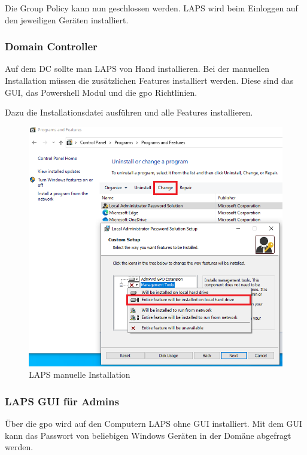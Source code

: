 Die Group Policy kann nun geschlossen werden.
LAPS wird beim Einloggen auf den jeweiligen Geräten installiert.

\subsubsection{Domain Controller}
Auf dem DC sollte man LAPS von Hand installieren.
Bei der manuellen Installation müssen die zusätzlichen Features installiert werden.
Diese sind das GUI, das Powershell Modul und die \acrshort{gpo} Richtlinien.

Dazu die Installationsdatei ausführen und alle Features installieren.
\begin{figure}[H]
    \centering
    \includegraphics[width=0.7\linewidth]{../img/LAPS/laps-ui-install-2.png}
    \caption{LAPS manuelle Installation}
\end{figure}


\subsubsection{LAPS GUI für Admins}\label{subsubsec:Laps-Gui}
Über die \acrshort{gpo} wird auf den Computern LAPS ohne GUI installiert.
Mit dem GUI kann das Passwort von beliebigen Windows Geräten in der Domäne abgefragt werden.\\

